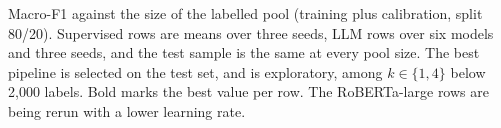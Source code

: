 \begin{table}[t]
  \centering
  \small
  \resizebox{\textwidth}{!}{}
  \caption{Macro-F1 against the size of the labelled pool (training plus calibration, split 80/20). Supervised rows are means over three seeds, LLM rows over six models and three seeds, and the test sample is the same at every pool size. The best pipeline is selected on the test set, and is exploratory, among $k \in \{1, 4\}$ below 2,000 labels. Bold marks the best value per row. The RoBERTa-large rows are being rerun with a lower learning rate.}
  \label{tab:pool}
\end{table}
